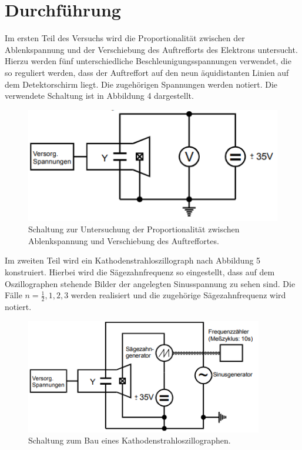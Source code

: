 \section{Durchführung}
\label{sec:Durchführung}

Im ersten Teil des Versuchs wird die Proportionalität zwischen der Ablenkspannung und der
Verschiebung des Auftrefforts des Elektrons untersucht. Hierzu werden fünf unterschiedliche
Beschleunigungsspannungen verwendet, die so reguliert werden, dass der Auftreffort auf den
neun äquidistanten Linien auf dem Detektorschirm liegt. Die zugehörigen Spannungen werden notiert.
Die verwendete Schaltung ist in Abbildung 4 dargestellt.
\begin{figure}[H]
  \centering
  \includegraphics[height=5cm]{schalt1.png}
  \caption{Schaltung zur Untersuchung der Proportionalität zwischen Ablenkspannung und Verschiebung des Auftreffortes. \cite[S.5]{kent}}
\end{figure}

Im zweiten Teil wird ein Kathodenstrahloszillograph nach Abbildung 5 konstruiert. Hierbei wird
die Sägezahnfrequenz so eingestellt, dass auf dem Oszillographen stehende Bilder der angelegten
Sinusspannung zu sehen sind. Die Fälle $n = \frac{1}{2}, 1, 2, 3$ werden realisiert und die
zugehörige Sägezahnfrequenz wird notiert.

\begin{figure}[H]
  \centering
  \includegraphics[height=5cm]{schalt2.png}
  \caption{Schaltung zum Bau eines Kathodenstrahloszillographen. \cite[S.5]{kent}}
\end{figure}
